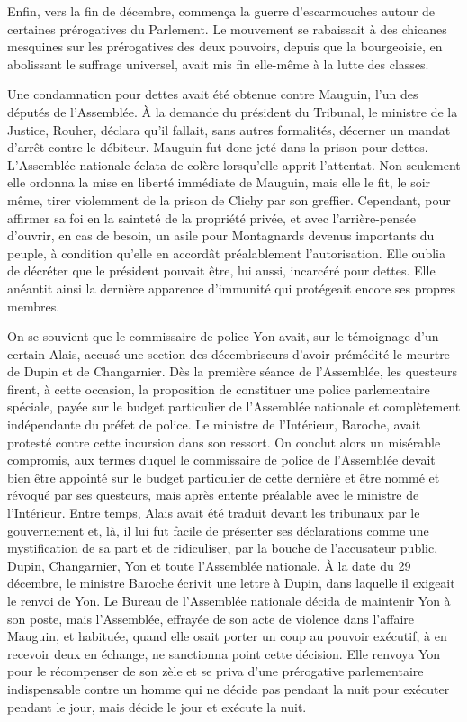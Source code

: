 \documentclass[french,twoside]{book} %
\begin{document}
Enfin, vers la fin de décembre, commença la guerre d’escarmouches autour de certaines prérogatives du Parlement. Le mouvement se rabaissait à des chicanes mesquines sur les prérogatives des deux pouvoirs, depuis que la bourgeoisie, en abolissant le suffrage universel, avait mis fin elle-même à la lutte des classes.\par
Une condamnation pour dettes avait été obtenue contre Mauguin, l’un des députés de l’Assemblée. À la demande du président du Tribunal, le ministre de la Justice, Rouher, déclara qu’il fallait, sans autres formalités, décerner un mandat d’arrêt contre le débiteur. Mauguin fut donc jeté dans la prison pour dettes. L’Assemblée nationale éclata de colère lorsqu’elle apprit l’attentat. Non seulement elle ordonna la mise en liberté immédiate de Mauguin, mais elle le fit, le soir même, tirer violemment de la prison de Clichy par son greffier. Cependant, pour affirmer sa foi en la sainteté de la propriété privée, et avec l’arrière-pensée d’ouvrir, en cas de besoin, un asile pour Montagnards devenus importants du peuple, à condition qu’elle en accordât préalablement l’autorisation. Elle oublia de décréter que le président pouvait être, lui aussi, incarcéré pour dettes. Elle anéantit ainsi la dernière apparence d’immunité qui protégeait encore ses propres membres.\par
On se souvient que le commissaire de police Yon avait, sur le témoignage d’un certain Alais, accusé une section des décembriseurs d’avoir prémédité le meurtre de Dupin et de Changarnier. Dès la première séance de l’Assemblée, les questeurs firent, à cette occasion, la proposition de constituer une police parlementaire spéciale, payée sur le budget particulier de l’Assemblée nationale et complètement indépendante du préfet de police. Le ministre de l’Intérieur, Baroche, avait protesté contre cette incursion dans son ressort. On conclut alors un misérable compromis, aux termes duquel le commissaire de police de l’Assemblée devait bien être appointé sur le budget particulier de cette dernière et être nommé et révoqué par ses questeurs, mais après entente préalable avec le ministre de l’Intérieur. Entre temps, Alais avait été traduit devant les tribunaux par le gouvernement et, là, il lui fut facile de présenter ses déclarations comme une mystification de sa part et de ridiculiser, par la bouche de l’accusateur public, Dupin, Changarnier, Yon et toute l’Assemblée nationale. À la date du 29 décembre, le ministre Baroche écrivit une lettre à Dupin, dans laquelle il exigeait le renvoi de Yon. Le Bureau de l’Assemblée nationale décida de maintenir Yon à son poste, mais l’Assemblée, effrayée de son acte de violence dans l’affaire Mauguin, et habituée, quand elle osait porter un coup au pouvoir exécutif, à en recevoir deux en échange, ne sanctionna point cette décision. Elle renvoya Yon pour le récompenser de son zèle et se priva d’une prérogative parlementaire indispensable contre un homme qui ne décide pas pendant la nuit pour exécuter pendant le jour, mais décide le jour et exécute la nuit.\par
\end{document}
